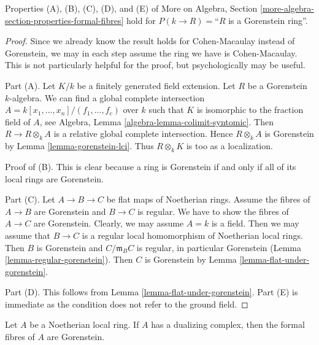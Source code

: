 \begin{lemma}
\label{lemma-formal-fibres-gorenstein}
Properties (A), (B), (C), (D), and (E) of
More on Algebra, Section \ref{more-algebra-section-properties-formal-fibres}
hold for $P(k \to R) =$``$R$ is a Gorenstein ring''.
\end{lemma}

\begin{proof}
Since we already know the result holds for Cohen-Macaulay instead
of Gorenstein, we may in each step assume the ring we have is
Cohen-Macaulay. This is not particularly helpful for the proof, but
psychologically may be useful.

\medskip\noindent
Part (A). Let $K/k$ be a finitely generated field extension.
Let $R$ be a Gorenstein $k$-algebra.
We can find a global complete intersection
$A = k[x_1, \ldots, x_n]/(f_1, \ldots, f_c)$
over $k$ such that $K$ is isomorphic to the fraction field of $A$, see
Algebra, Lemma \ref{algebra-lemma-colimit-syntomic}.
Then $R \to R \otimes_k A$ is a relative global complete intersection.
Hence $R \otimes_k A$ is Gorenstein by Lemma \ref{lemma-gorenstein-lci}.
Thus $R \otimes_k K$ is too as a localization.

\medskip\noindent
Proof of (B). This is clear because a ring is Gorenstein
if and only if all of its local rings are Gorenstein.

\medskip\noindent
Part (C). Let $A \to B \to C$ be flat maps of Noetherian rings.
Assume the fibres of $A \to B$ are Gorenstein and $B \to C$ is regular.
We have to show the fibres of $A \to C$ are Gorenstein.
Clearly, we may assume $A = k$ is a field. Then we may assume that
$B \to C$ is a regular local homomorphism of Noetherian local rings.
Then $B$ is Gorenstein and $C/\mathfrak m_B C$ is regular, in
particular Gorenstein (Lemma \ref{lemma-regular-gorenstein}).
Then $C$ is Gorenstein by
Lemma \ref{lemma-flat-under-gorenstein}.

\medskip\noindent
Part (D). This follows from Lemma \ref{lemma-flat-under-gorenstein}.
Part (E) is immediate as the condition does not refer to the ground field.
\end{proof}

\begin{lemma}
\label{lemma-dualizing-gorenstein-formal-fibres}
Let $A$ be a Noetherian local ring. If $A$ has a dualizing complex,
then the formal fibres of $A$ are Gorenstein.
\end{lemma}

